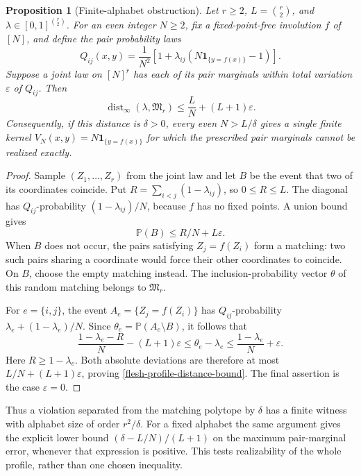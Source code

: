 \documentclass[a4paper,11pt,reqno]{amsart}
\theoremstyle{plain}
\newtheorem{proposition}[theorem]{Proposition}
\theoremstyle{definition}
\theoremstyle{remark}
\begin{document}
\begin{proposition}[Finite-alphabet obstruction]
\label{flesh-profile-finite-obstruction}
Let $r\ge2$, $L=\binom r2$, and
$\lambda\in[0,1]^{\binom r2}$.  For an even integer $N\ge2$,
fix a fixed-point-free involution $f$ of $[N]$, and define the
pair probability laws
\[
 Q_{ij}(x,y)=\frac{1}{N^2}
 \left[1+\lambda_{ij}
       \left(N\mathbf1_{\{y=f(x)\}}-1\right)\right].
\]
Suppose a joint law on $[N]^r$ has each of its pair marginals
within total variation $\varepsilon$ of $Q_{ij}$.  Then
\begin{equation}\label{flesh-profile-distance-bound}
 \operatorname{dist}_\infty(\lambda,\mathfrak M_r)
       \le\frac{L}{N}+(L+1)\varepsilon.
\end{equation}
Consequently, if this distance is $\delta>0$, every even
$N>L/\delta$ gives a single finite kernel
$V_N(x,y)=N\mathbf1_{\{y=f(x)\}}$ for which the prescribed
pair marginals cannot be realized exactly.
\end{proposition}
\begin{proof}
Sample $(Z_1,\ldots,Z_r)$ from the joint law and let $B$ be the
event that two of its coordinates coincide.  Put
$R=\sum_{i<j}(1-\lambda_{ij})$, so $0\le R\le L$.
The diagonal has $Q_{ij}$-probability $(1-\lambda_{ij})/N$,
because $f$ has no fixed points.  A union bound gives
\[
 \mathbb P(B)\le R/N+L\varepsilon.
\]
When $B$ does not occur, the pairs satisfying $Z_j=f(Z_i)$
form a matching: two such pairs sharing a coordinate would
force their other coordinates to coincide.  On $B$, choose the
empty matching instead.  The inclusion-probability vector
$\theta$ of this random matching belongs to $\mathfrak M_r$.

For $e=\{i,j\}$, the event $A_e=\{Z_j=f(Z_i)\}$ has
$Q_{ij}$-probability
$\lambda_e+(1-\lambda_e)/N$.  Since
$\theta_e=\mathbb P(A_e\setminus B)$, it follows that
\[
 \frac{1-\lambda_e-R}{N}-(L+1)\varepsilon
 \le\theta_e-\lambda_e
 \le\frac{1-\lambda_e}{N}+\varepsilon.
\]
Here $R\ge1-\lambda_e$.  Both absolute deviations are therefore
at most $L/N+(L+1)\varepsilon$, proving
\eqref{flesh-profile-distance-bound}.  The final assertion is
the case $\varepsilon=0$.
\end{proof}

Thus a violation separated from the matching polytope by $\delta$
has a finite witness with alphabet size of order $r^2/\delta$.
For a fixed alphabet the same argument gives the explicit lower
bound $(\delta-L/N)/(L+1)$ on the maximum pair-marginal error,
whenever that expression is positive.  This tests realizability
of the whole profile, rather than one chosen inequality.
\end{document}
